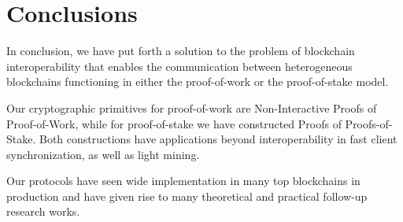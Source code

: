 \section{Conclusions}

In conclusion, we have put forth a solution to the problem of blockchain
interoperability that enables the communication between heterogeneous
blockchains functioning in either the proof-of-work or the proof-of-stake
model.

Our cryptographic primitives for proof-of-work are Non-Interactive Proofs
of Proof-of-Work, while for proof-of-stake we have constructed Proofs of
Proofs-of-Stake. Both constructions have applications beyond interoperability
in fast client synchronization, as well as light mining.

Our protocols have seen wide implementation in many top blockchains in
production and have given rise to many theoretical and practical follow-up
research works.
